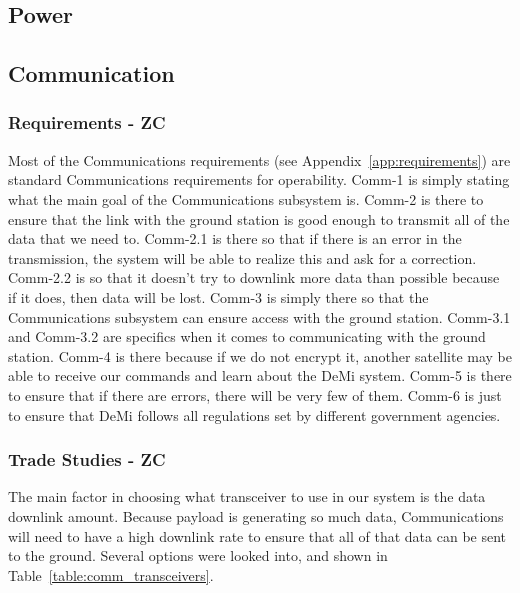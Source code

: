 \documentclass[12pt]{article}
\begin{document}

		\subsection{Power}


		\subsection{Communication}

			\subsubsection{Requirements - ZC}

Most of the Communications requirements (see Appendix~\ref{app:requirements}) are standard Communications requirements for operability. Comm-1 is simply stating what the main goal of the Communications subsystem is. Comm-2 is there to ensure that the link with the ground station is good enough to transmit all of the data that we need to. Comm-2.1 is there so that if there is an error in the transmission, the system will be able to realize this and ask for a correction. Comm-2.2 is so that it doesn’t try to downlink more data than possible because if it does, then data will be lost. Comm-3 is simply there so that the Communications subsystem can ensure access with the ground station. Comm-3.1 and Comm-3.2 are specifics when it comes to communicating with the ground station. Comm-4 is there because if we do not encrypt it, another satellite may be able to receive our commands and learn about the DeMi system. Comm-5 is there to ensure that if there are errors, there will be very few of them. Comm-6 is just to ensure that DeMi follows all regulations set by different government agencies.

			\subsubsection{Trade Studies - ZC}\label{sec:comm_tradestudies}
The main factor in choosing what transceiver to use in our system is the data downlink amount. Because payload is generating so much data, Communications will need to have a high downlink rate to ensure that all of that data can be sent to the ground. Several options were looked into, and shown in Table~\ref{table:comm_transceivers}.
\end{document}
